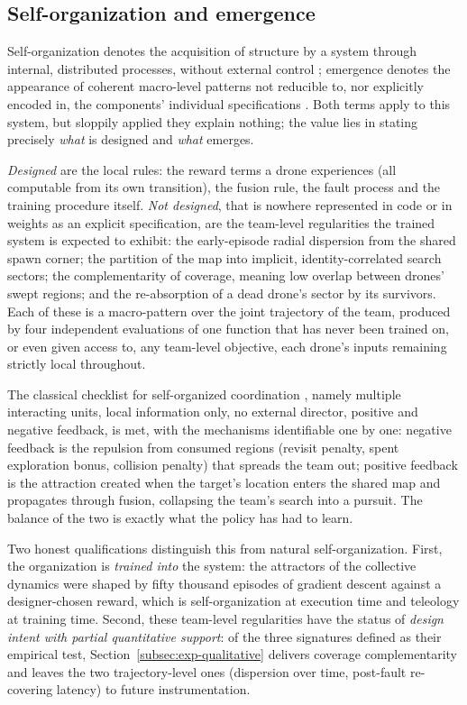 \subsection{Self-organization and emergence}
\label{subsec:mas-emergence}

Self-organization denotes the acquisition of structure by a system through
internal, distributed processes, without external control
\citep{ashby1962principles,camazine2001self}; emergence denotes the appearance of
coherent macro-level patterns not reducible to, nor explicitly encoded in, the
components' individual specifications \citep{goldstein1999emergence}. Both terms
apply to this system, but sloppily applied they explain nothing; the value lies
in stating precisely \emph{what} is designed and \emph{what} emerges.

\emph{Designed} are the local rules: the reward terms a drone experiences (all
computable from its own transition), the fusion rule, the fault process and the
training procedure itself. \emph{Not designed}, that is nowhere represented in
code or in weights as an explicit specification, are the team-level regularities
the trained system is expected to exhibit: the early-episode radial dispersion
from the shared spawn corner; the partition of the map into implicit,
identity-correlated search sectors; the complementarity of coverage, meaning low
overlap between drones' swept regions; and the re-absorption of a dead drone's
sector by its survivors. Each of these is a macro-pattern over the joint
trajectory of the team, produced by four independent evaluations of one function
that has never been trained on, or even given access to, any team-level
objective, each drone's inputs remaining strictly local throughout.

The classical checklist for self-organized coordination
\citep{camazine2001self}, namely multiple interacting units, local information
only, no external director, positive and negative feedback, is met, with the
mechanisms identifiable one by one: negative feedback is the repulsion from
consumed regions (revisit penalty, spent exploration bonus, collision penalty)
that spreads the team out; positive feedback is the attraction created when the
target's location enters the shared map and propagates through fusion, collapsing
the team's search into a pursuit. The balance of the two is exactly what the
policy has had to learn.

Two honest qualifications distinguish this from natural self-organization. First,
the organization is \emph{trained into} the system: the attractors of the
collective dynamics were shaped by fifty thousand episodes of gradient descent
against a designer-chosen reward, which is self-organization at execution time
and teleology at training time. Second, these team-level regularities have the
status of \emph{design intent with partial quantitative support}: of the three
signatures defined as their empirical test,
Section~\ref{subsec:exp-qualitative} delivers coverage complementarity and leaves
the two trajectory-level ones (dispersion over time, post-fault re-covering
latency) to future instrumentation.

